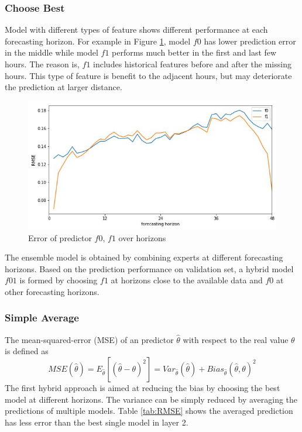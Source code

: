 \documentclass[conference]{IEEEtran}
\begin{document}
\subsubsection{Choose Best}
Model with different types of feature shows different performance at each forecasting horizon. For example in Figure \ref{fig:f0f1}, model $f0$ has lower prediction error in the middle while model $f1$ performs much better in the first and last few hours. The reason is, $f1$ includes historical features before and after the missing hours. This type of feature is benefit to the adjacent hours, but may deteriorate the prediction at larger distance.
\begin{figure}[b]
\centering
\vspace*{-5mm}
\includegraphics[width=0.8\columnwidth]{FIG/f0f1}
\caption{Error of predictor $f0$, $f1$ over horizons}
\label{fig:f0f1}
\end{figure}
The ensemble model is obtained by combining experts at different forecasting horizons. Based on the prediction performance on validation set, a hybrid model $f01$ is formed by choosing $f1$ at horizons close to the available data and $f0$ at other forecasting horizons.

\subsubsection{Simple Average}
The mean-squared-error (MSE) of an predictor $\hat{\theta}$ with respect to the real value $\theta$ is defined as
\begin{equation}
    MSE(\hat{\theta}) = E_{\hat{\theta}}[(\hat{\theta} - \theta)^2] = Var_{\hat{\theta}}(\hat{\theta}) + Bias_{\hat{\theta}}(\hat{\theta}, \theta)^2
\end{equation}
The first hybrid approach is aimed at reducing the bias by choosing the best model at different horizons. The variance can be simply reduced by averaging the predictions of multiple models. Table \ref{tab:RMSE} shows the averaged prediction has less error than the best single model in layer 2.
\end{document}
